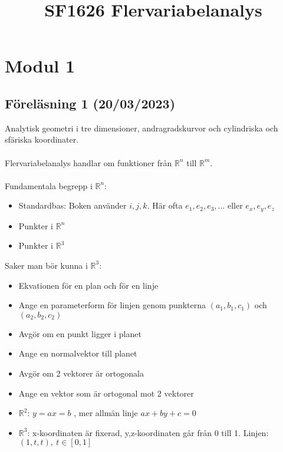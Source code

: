 \documentclass{report}
\title{\Huge{SF1626 Flervariabelanalys}}
\author{\huge{}}
\date{}
\begin{document}
\maketitle
\newpage
{}
\tableofcontents
\pagebreak

\chapter{Modul 1}
\section{Föreläsning 1 (20/03/2023)}
Analytisk geometri i tre dimensioner, andragradskurvor och cylindriska och sfäriska koordinater.\\\\

Flervariabelanalys handlar om funktioner från $ \mathbb{R}^n $ till $ \mathbb{R}^m $.\\\\

Fundamentala begrepp i $ \mathbb{R}^n $:
\begin{itemize}
	\item Standardbas: Boken använder $ i,j,k $. Här ofta $ e_1, e_2, e_3, \ldots  $ eller $ e_x, e_y, e_z $
	\item Punkter i $ \mathbb{R}^n $
	\item Punkter i $ \mathbb{R}^3 $ 
\end{itemize}
\vspace{20pt}
Saker man bör kunna i $ \mathbb{R}^3 $:
\begin{itemize}
	\item Ekvationen för en plan och för en linje
	\item Ange en parameterform för linjen genom punkterna $ (a_1,b_1,c_1) $ och $ (a_2,b_2,c_2) $
	\item Avgör om en punkt ligger i planet
	\item Ange en normalvektor till planet
	\item Avgör om 2 vektorer är ortogonala
	\item Ange en vektor som är ortogonal mot 2 vektorer
\end{itemize}

{
\begin{itemize}
	\item $ \mathbb{R}^2 $: $ y = ax=b $ , mer allmän linje $ ax+by+c = 0 $
	\item $ \mathbb{R}^3 $: x-koordinaten är fixerad, y,z-koordinaten går från 0 till 1. Linjen: $ (1,t,t), \: t \in [0,1] $  
\end{itemize}
}
\end{document}
